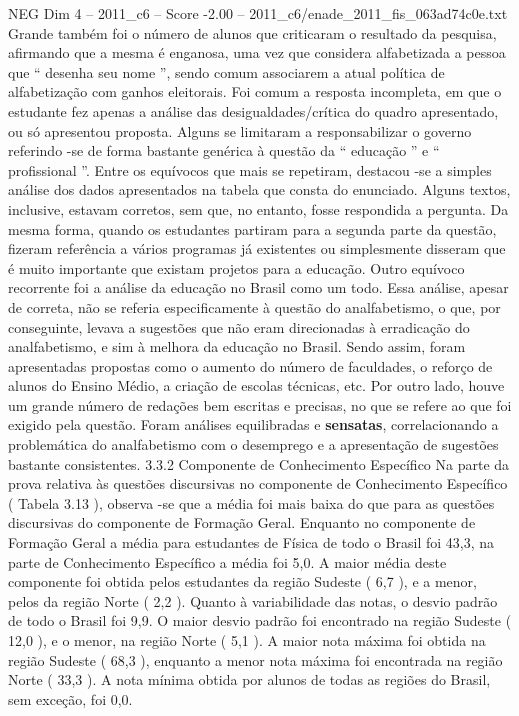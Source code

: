 \begin{textsample}{NEG Dim 4 – 2011\_c6 – Score -2.00 – 2011\_c6/enade\_2011\_fis\_063ad74c0e.txt}
Grande também foi o número de alunos que criticaram o resultado da pesquisa, afirmando que a mesma é enganosa, uma vez que considera alfabetizada a pessoa que “ desenha seu nome ”, sendo comum associarem a atual política de alfabetização com ganhos eleitorais.
Foi comum a resposta incompleta, em que o estudante fez apenas a análise das desigualdades/crítica do quadro apresentado, ou só apresentou proposta.
Alguns se limitaram a responsabilizar o governo referindo -se de forma bastante genérica à questão da “ educação ” e “ profissional ”.
Entre os equívocos que mais se repetiram, destacou -se a simples análise dos dados apresentados na tabela que consta do enunciado.
Alguns textos, inclusive, estavam corretos, sem que, no entanto, fosse respondida a pergunta.
Da mesma forma, quando os estudantes partiram para a segunda parte da questão, fizeram referência a vários programas já existentes ou simplesmente disseram que é muito importante que existam projetos para a educação.
Outro equívoco recorrente foi a análise da educação no Brasil como um todo.
Essa análise, apesar de correta, não se referia especificamente à questão do analfabetismo, o que, por conseguinte, levava a sugestões que não eram direcionadas à erradicação do analfabetismo, e sim à melhora da educação no Brasil.
Sendo assim, foram apresentadas propostas como o aumento do número de faculdades, o reforço de alunos do Ensino Médio, a criação de escolas técnicas, etc.
Por outro lado, houve um grande número de redações bem escritas e precisas, no que se refere ao que foi exigido pela questão.
Foram análises equilibradas e \textbf{sensatas}, correlacionando a problemática do analfabetismo com o desemprego e a apresentação de sugestões bastante consistentes. 3.3.2 Componente de Conhecimento Específico Na parte da prova relativa às questões discursivas no componente de Conhecimento Específico ( Tabela 3.13 ), observa -se que a média foi mais baixa do que para as questões discursivas do componente de Formação Geral.
Enquanto no componente de Formação Geral a média para estudantes de Física de todo o Brasil foi 43,3, na parte de Conhecimento Específico a média foi 5,0.
A maior média deste componente foi obtida pelos estudantes da região Sudeste ( 6,7 ), e a menor, pelos da região Norte ( 2,2 ).
Quanto à variabilidade das notas, o desvio padrão de todo o Brasil foi 9,9.
O maior desvio padrão foi encontrado na região Sudeste ( 12,0 ), e o menor, na região Norte ( 5,1 ).
A maior nota máxima foi obtida na região Sudeste ( 68,3 ), enquanto a menor nota máxima foi encontrada na região Norte ( 33,3 ).
A nota mínima obtida por alunos de todas as regiões do Brasil, sem exceção, foi 0,0.

\end{textsample}
